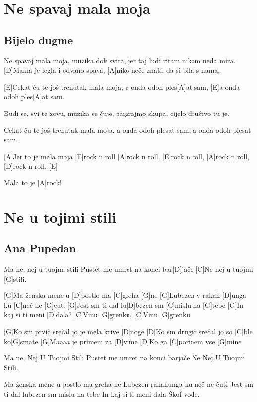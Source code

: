 \documentclass[a4paper,12pt]{article}
\begin{document}
\begin{multicols}{2}
\begin{guitar}
\end{guitar}
\section{Ne spavaj mala moja}
\subsection*{Bijelo dugme}
\begin{guitar}
[A]Ne spavaj mala moja, muzika dok svira,
jer taj ludi ritam nikom neda mira.
[D]Mama je legla i odvano spava,
[A]niko neče znati, da si bila s nama.


[E]Cekat ču te još trenutak mala moja,
a onda odoh ples[A]at sam,
[E]a onda odoh ples[A]at sam.


Budi se, svi te zovu, muzika se čuje, 
zaigrajmo skupa, cijelo društvo tu je.

 
Cekat ču te još trenutak mala moja,
a onda odoh plesat sam,
a onda odoh plesat sam.


[A]Jer to je mala moja [E]rock n roll
[A]rock n roll, [E]rock n roll,
[A]rock n roll, [D]rock n roll. [E]

Mala to je [A]rock!

\end{guitar}
\section{Ne u tojimi stili}
\subsection*{Ana Pupedan}
\begin{guitar}
[G]Ma ne, nej u tuojmi stili
Pustet me umret na konci bar[D]jače
[C]Ne nej u tuojmi [G]stili.


[G]Ma ženska mene u [D]postlo ma [C]greha [G]ne
[G]Lubezen v rakah [D]unga ku [C]neč ne [G]cuti
[G]Jest sm ti dal lu[D]bezen sm [C]mislu na [G]tebe
[G]In kaj si ti meni [D]dala?
[C]Vinu [G]grenku, [C]Vinu [G]grenku


[G]Ko sm prvič srečal jo je mela krive [D]noge
[D]Ko sm drugič srečal jo so [C]ble ko[G]smate
[G]Maaaa je primem za [D]vime
[D]Ko ga [C]porinem vse [G]mine


Ma ne, Nej U Tuojmi Stili
Pustet me umret na konci barjače
Ne Nej U Tuojmi Stili.


Ma ženska mene u postlo ma greha ne
Lubezen rakahunga ku neč ne čuti
Jest sm ti dal lubezen sm mislu na tebe
In kaj si ti meni dala
Škof vode.



\end{guitar}
\end{multicols}
\end{document}
